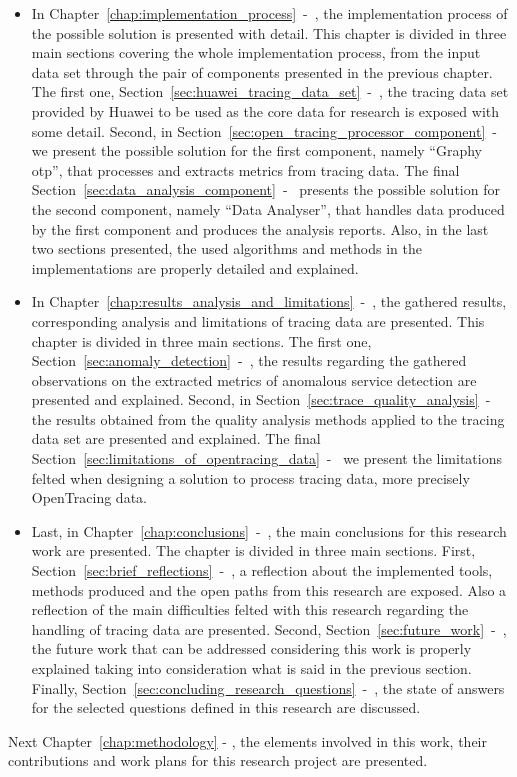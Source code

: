 \begin{itemize}
    \item In Chapter~\ref{chap:implementation_process}~-~, the implementation process of the possible solution is presented with detail. This chapter is divided in three main sections covering the whole implementation process, from the input data set through the pair of components presented in the previous chapter. The first one, Section~\ref{sec:huawei_tracing_data_set}~-~, the tracing data set provided by Huawei to be used as the core data for research is exposed with some detail. Second, in Section~\ref{sec:open_tracing_processor_component}~-~ we present the possible solution for the first component, namely ``Graphy \gls{otp}'', that processes and extracts metrics from tracing data. The final Section~\ref{sec:data_analysis_component}~-~ presents the possible solution for the second component, namely ``Data Analyser'', that handles data produced by the first component and produces the analysis reports. Also, in the last two sections presented, the used algorithms and methods in the implementations are properly detailed and explained.  
    \item In Chapter~\ref{chap:results_analysis_and_limitations}~-~, the gathered results, corresponding analysis and limitations of tracing data are presented. This chapter is divided in three main sections. The first one, Section~\ref{sec:anomaly_detection}~-~, the results regarding the gathered observations on the extracted metrics of anomalous service detection are presented and explained. Second, in Section~\ref{sec:trace_quality_analysis}~-~ the results obtained from the quality analysis methods applied to the tracing data set are presented and explained. The final Section~\ref{sec:limitations_of_opentracing_data}~-~ we present the limitations felted when designing a solution to process tracing data, more precisely OpenTracing data.
    \item Last, in Chapter~\ref{chap:conclusions}~-~, the main conclusions for this research work are presented. The chapter is divided in three main sections. First, Section~\ref{sec:brief_reflections}~-~, a reflection about the implemented tools, methods produced and the open paths from this research are exposed. Also a reflection of the main difficulties felted with this research regarding the handling of tracing data are presented. Second, Section~\ref{sec:future_work}~-~, the future work that can be addressed considering this work is properly explained taking into consideration what is said in the previous section. Finally, Section~\ref{sec:concluding_research_questions}~-~, the state of answers for the selected questions defined in this research are discussed.
\end{itemize}

Next Chapter~\ref{chap:methodology} - , the elements involved in this work, their contributions and work plans for this research project are presented.

\checkoddpage
{}
{ %
\newpage
\blankpage}
{ %
}